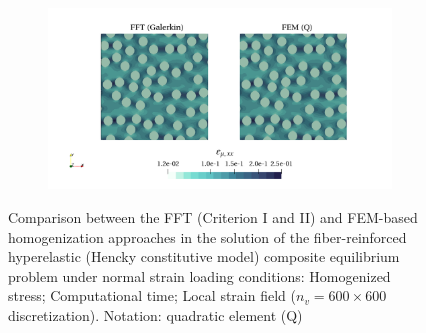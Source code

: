 \begin{figure}[hbt]
\begin{subfigure}[b]{0.49\textwidth}
    \caption{}
    \label{subfig:hencky_2D_normal_cpu_time_vs_n_voxels}
  \end{subfigure}
  \begin{subfigure}[b]{\textwidth}
    \centering
    \includegraphics[width=\textwidth]{figures/hencky_2D_normal_strain_11}
    \caption{}
    \label{subfig:hencky_2D_normal_strain_11}
  \end{subfigure}
  \caption{Comparison between the FFT (Criterion I and II) and FEM-based homogenization approaches in the
  solution of the fiber-reinforced hyperelastic (Hencky constitutive model) composite equilibrium problem under normal strain loading conditions:
   Homogenized stress;
   Computational time;
   Local strain field (\(n_v = 600 \times 600\)
  discretization). Notation: quadratic element (Q)}
\label{fig:hencky_2D_normal}
\end{figure}

